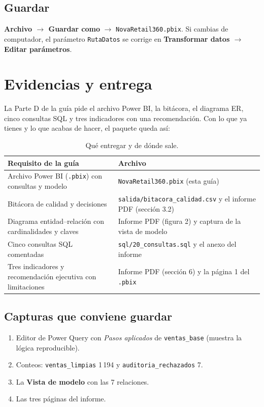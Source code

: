 \documentclass[11pt,letterpaper]{article}
\newcommand{\ui}[1]{\textbf{#1}}                 %
\begin{document}
\subsection{Guardar}

\ui{Archivo $\rightarrow$ Guardar como} $\rightarrow$ \texttt{NovaRetail360.pbix}. Si cambias de computador, el parámetro
\texttt{RutaDatos} se corrige en \ui{Transformar datos $\rightarrow$ Editar parámetros}.

\section{Evidencias y entrega}

La Parte D de la guía pide el archivo Power BI, la bitácora, el diagrama ER, cinco consultas SQL y tres indicadores con una
recomendación. Con lo que ya tienes y lo que acabas de hacer, el paquete queda así:

\begin{table}[H]
\centering
\caption{Qué entregar y de dónde sale.}
\begin{tabularx}{\linewidth}{L L}
\toprule
Requisito de la guía & Archivo \\
\midrule
Archivo Power BI (\texttt{.pbix}) con consultas y modelo & \texttt{NovaRetail360.pbix} (esta guía) \\
Bitácora de calidad y decisiones & \texttt{salida/bitacora\_calidad.csv} y el informe PDF (sección 3.2) \\
Diagrama entidad--relación con cardinalidades y claves & Informe PDF (figura 2) y captura de la vista de modelo \\
Cinco consultas SQL comentadas & \texttt{sql/20\_consultas.sql} y el anexo del informe \\
Tres indicadores y recomendación ejecutiva con limitaciones & Informe PDF (sección 6) y la página 1 del \texttt{.pbix} \\
\bottomrule
\end{tabularx}
\end{table}

\subsection{Capturas que conviene guardar}

\begin{enumerate}
  \item Editor de Power Query con \emph{Pasos aplicados} de \texttt{ventas\_base} (muestra la lógica reproducible).
  \item Conteos: \texttt{ventas\_limpias} 1\,194 y \texttt{auditoria\_rechazados} 7.
  \item La \ui{Vista de modelo} con las 7 relaciones.
  \item Las tres páginas del informe.
\end{enumerate}
\end{document}
